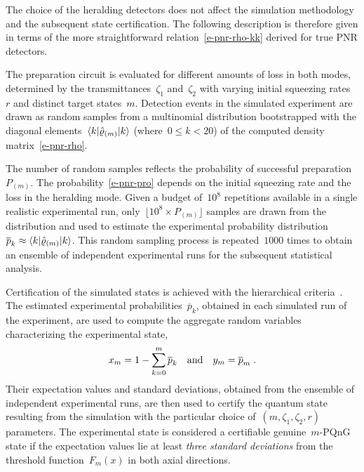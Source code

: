 \documentclass{optica-article}
\begin{document}
The choice of the heralding detectors does not affect the simulation methodology and the subsequent state certification. The following description is therefore given in terms of the more straightforward relation~\eqref{e-pnr-rho-kk} derived for true PNR detectors.

The preparation circuit is evaluated for different amounts of loss in both modes, determined by the transmittances~$\zeta_{1}$ and~$\zeta_{2}$ with varying initial squeezing rates~$r$ and distinct target states~${m}$. Detection events in the simulated experiment are drawn as random samples from a multinomial distribution bootstrapped with the diagonal elements~$\braket{k|\hat{\varrho}_{(m)}|k}$ (where~${0 \leq k < 20}$) of the computed density matrix~\eqref{e-pnr-rho}. 

The number of random samples reflects the probability of successful preparation~$P_{(m)}$. The probability~\eqref{e-pnr-pro} depends on the initial squeezing rate and the loss in the heralding mode. Given a budget of~$10^{8}$ repetitions available in a single realistic experimental run, only~${\lfloor 10^{8} \times P_{(m)} \rfloor}$ samples are drawn from the distribution and used to estimate the experimental probability distribution~${\overline{p}_{k} \approx \braket{k|\hat{\varrho}_{(m)}|k}}$. This random sampling process is repeated~$1000$ times to obtain an ensemble of independent experimental runs for the subsequent statistical analysis.

Certification of the simulated states is achieved with the hierarchical criteria~\cite{lachman2019}. The estimated experimental probabilities~$\overline{p}_{k}$, obtained in each simulated run of the experiment, are used to compute the aggregate random variables characterizing the experimental state,
%
\begin{equation}
  x_{m} = 1 - \sum_{k = 0}^{m} \overline{p}_{k} 
  \quad\text{and}\quad
  y_{m} = \overline{p}_{m} 
  \;\text{.}
\end{equation}
%
Their expectation values and standard deviations, obtained from the ensemble of independent experimental runs, are then used to certify the quantum state resulting from the simulation with the particular choice of~${(m, \zeta_{1}, \zeta_{2}, r)}$ parameters. The experimental state is considered a certifiable genuine~$m$-PQnG state if the expectation values lie at least \emph{three standard deviations} from the threshold function~$F_{m} (x)$ in both axial directions.
\end{document}
